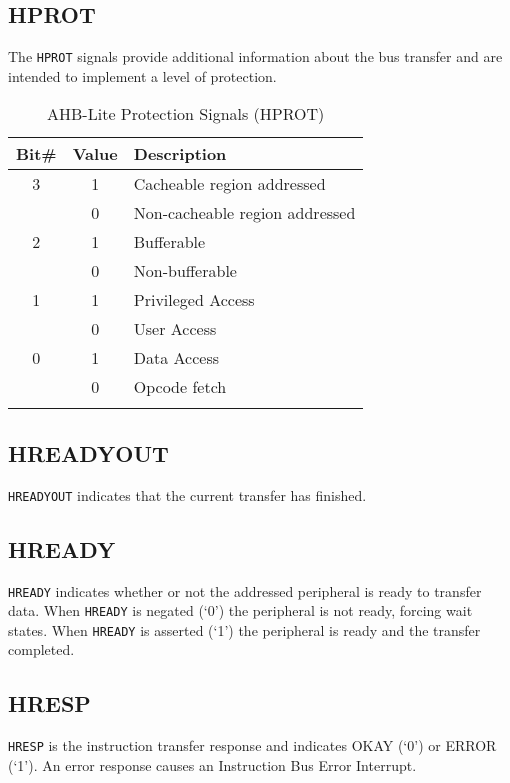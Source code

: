 \subsection{HPROT}\label{hprot}

The \texttt{HPROT} signals provide additional information about the bus transfer
and are intended to implement a level of protection.

\begin{longtable}[]{@{}ccl@{}}
	\toprule
		Bit\# & Value & Description\tabularnewline
	\midrule
	\endhead
		3 & 1 & Cacheable region addressed\tabularnewline
		  & 0 & Non-cacheable region addressed\tabularnewline
		2 & 1 & Bufferable\tabularnewline
		  & 0 & Non-bufferable\tabularnewline
		1 & 1 & Privileged Access\tabularnewline
		  & 0 & User Access\tabularnewline
		0 & 1 & Data Access\tabularnewline
		  & 0 & Opcode fetch\tabularnewline
	\bottomrule
	\caption{AHB-Lite Protection Signals (HPROT)}
\end{longtable}

\subsection{HREADYOUT}\label{hreadyout}

\texttt{HREADYOUT} indicates that the current transfer has finished.

\subsection{HREADY}\label{hready}

\texttt{HREADY} indicates whether or not the addressed peripheral is ready to
transfer data. When \texttt{HREADY} is negated (`0') the peripheral is not ready,
forcing wait states. When \texttt{HREADY} is asserted (`1') the peripheral is
ready and the transfer completed.

\subsection{HRESP}\label{hresp}

\texttt{HRESP} is the instruction transfer response and indicates OKAY (`0') or
ERROR (`1'). An error response causes an Instruction Bus Error
Interrupt.
